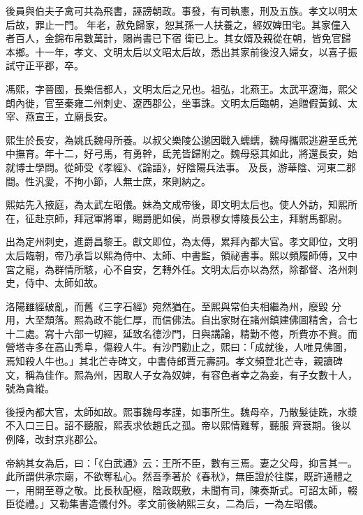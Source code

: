 \begin{pinyinscope}
 後員與伯夫子禽可共為飛書，誣謗朝政。事發，有司執憲，刑及五族。孝文以明太后故，罪止一門。年老，赦免歸家，恕其孫一人扶養之，經奴婢田宅。其家僮入者百人，金錦布帛數萬計，賜尚書已下宿
 衛已上。其女婿及親從在朝，皆免官歸本鄉。十一年，孝文、文明太后以文昭太后故，悉出其家前後沒入婦女，以喜子振試守正平郡，卒。



 馮熙，字晉國，長樂信都人，文明太后之兄也。祖弘，北燕王。太武平遼海，熙父朗內徙，官至秦雍二州刺史、遼西郡公，坐事誅。文明太后臨朝，追贈假黃鉞、太宰、燕宣王，立廟長安。



 熙生於長安，為姚氏魏母所養。以叔父樂陵公邈因戰入蠕蠕，魏母攜熙逃避至氐羌中撫育。年十二，好弓馬，有勇幹，氐羌皆歸附之。魏母惡其如此，將還長安，始就博士學問。從師受《孝經》、《論語》，好陰陽兵法事。
 及長，游華陰、河東二郡間。性汎愛，不拘小節，人無士庶，來則納之。



 熙姑先入掖庭，為太武左昭儀。妹為文成帝後，即文明太后也。使人外訪，知熙所在，征赴京師，拜冠軍將軍，賜爵肥如侯，尚景穆女博陵長公主，拜駙馬都尉。



 出為定州刺史，進爵昌黎王。獻文即位，為太傅，累拜內都大官。孝文即位，文明太后臨朝，帝乃承旨以熙為侍中、太師、中書監，領祕書事。熙以頻履師傅，又中宮之寵，為群情所駭，心不自安，乞轉外任。文明太后亦以為然，除都督、洛州刺史，侍中、太師如故。



 洛陽雖經破亂，而舊《三字石經》宛然猶在。至熙與常伯夫相繼為州，廢毀
 分用，大至頹落。熙為政不能仁厚，而信佛法。自出家財在諸州鎮建佛圖精舍，合七十二處。寫十六部一切經，延致名德沙門，日與講論，精勤不倦，所費亦不貲。而營塔寺多在高山秀阜，傷殺人牛。有沙門勸止之，熙曰：「成就後，人唯見佛圖，焉知殺人牛也。」其北芒寺碑文，中書侍郎賈元壽詞。孝文頻登北芒寺，親讀碑文，稱為佳作。熙為州，因取人子女為奴婢，有容色者幸之為妾，有子女數十人，號為貪縱。



 後授內都大官，太師如故。熙事魏母孝謹，如事所生。魏母卒，乃散髮徒跣，水漿不入口三日。詔不聽服，熙表求依趙氏之孤。帝以熙情難奪，聽服
 齊衰期。後以例降，改封京兆郡公。



 帝納其女為后，曰：「《白武通》云：王所不臣，數有三焉。妻之父母，抑言其一。此所謂供承宗廟，不欲奪私心。然吾季著於《春秋》，無臣證於往牒，既許通體之一，用開至尊之敬。比長秋配極，陰政既敷，未聞有司，陳奏斯式。可詔太師，輟臣從禮。」又勒集書造儀付外。孝文前後納熙三女，二為后，一為左昭儀。




\end{pinyinscope}

